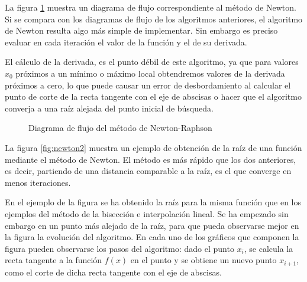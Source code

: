 La figura \ref{fig:newton} muestra un diagrama de flujo correspondiente al método de Newton. Si se compara con los diagramas de flujo de los algoritmos anteriores, el algoritmo de Newton resulta algo más simple de implementar. Sin embargo es preciso evaluar en cada iteración el valor de la función y el de su derivada. 

El cálculo de la derivada, es el punto débil de este algoritmo, ya que para valores $x_0$ próximos a un mínimo o máximo local obtendremos valores de la derivada próximos a cero, lo que puede causar un error de desbordamiento al calcular el punto de corte de la recta tangente con el eje de abscisas o hacer que el algoritmo converja a una raíz alejada del punto inicial de búsqueda.
 
\begin{figure}[h]
\centering
{}
\caption{Diagrama de flujo del método de Newton-Raphson}
\label{fig:newton}
\end{figure}

La figura \ref{fig:newton2} muestra un ejemplo de obtención de la raíz de una función mediante el método de Newton. El método es más rápido que los dos anteriores, es decir, partiendo de una distancia comparable a la raíz, es el que converge en menos iteraciones. 

En el ejemplo de la figura se ha obtenido la raíz para la misma función que en los ejemplos del método de la bisección e interpolación lineal. Se ha empezado sin embargo en un punto más alejado de la raíz, para que pueda observarse mejor en la figura la evolución del algoritmo. En cada uno de los gráficos que componen la figura pueden observarse  los pasos del algoritmo: dado el punto  $x_i$, se calcula  la recta tangente a la función $f(x)$ en el punto y se obtiene un nuevo punto $x_{i+1}$,  como el corte de dicha recta tangente con el eje de abscisas.

